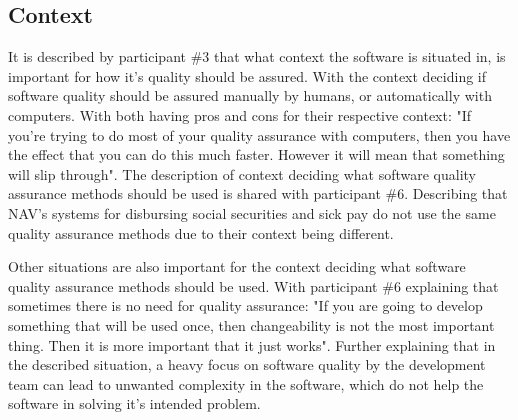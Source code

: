 \subsection{Context}
It is described by participant \#3 that what context the software is situated in, is important for how it's quality should be assured. With the context deciding if software quality should be assured manually by humans, or automatically with computers. With both having pros and cons for their respective context: "If you're trying to do most of your quality assurance with computers, then you have the effect that you can do this much faster. However it will mean that something will slip through". The description of context deciding what software quality assurance methods should be used is shared with participant \#6. Describing that NAV's systems for disbursing social securities and sick pay do not use the same quality assurance methods due to their context being different.




Other situations are also important for the context deciding what software quality assurance methods should be used. With participant \#6 explaining that sometimes there is no need for quality assurance: "If you are going to develop something that will be used once, then changeability is not the most important thing. Then it is more important that it just works". Further explaining that in the described situation, a heavy focus on software quality by the development team can lead to unwanted complexity in the software, which do not help the software in solving it's intended problem.

